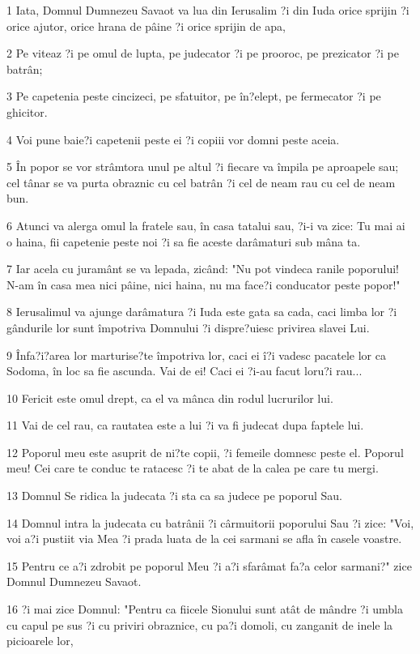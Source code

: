\par 1 Iata, Domnul Dumnezeu Savaot va lua din Ierusalim ?i din Iuda orice sprijin ?i orice ajutor, orice hrana de pâine ?i orice sprijin de apa,
\par 2 Pe viteaz ?i pe omul de lupta, pe judecator ?i pe prooroc, pe prezicator ?i pe batrân;
\par 3 Pe capetenia peste cincizeci, pe sfatuitor, pe în?elept, pe fermecator ?i pe ghicitor.
\par 4 Voi pune baie?i capetenii peste ei ?i copiii vor domni peste aceia.
\par 5 În popor se vor strâmtora unul pe altul ?i fiecare va împila pe aproapele sau; cel tânar se va purta obraznic cu cel batrân ?i cel de neam rau cu cel de neam bun.
\par 6 Atunci va alerga omul la fratele sau, în casa tatalui sau, ?i-i va zice: Tu mai ai o haina, fii capetenie peste noi ?i sa fie aceste darâmaturi sub mâna ta.
\par 7 Iar acela cu juramânt se va lepada, zicând: "Nu pot vindeca ranile poporului! N-am în casa mea nici pâine, nici haina, nu ma face?i conducator peste popor!"
\par 8 Ierusalimul va ajunge darâmatura ?i Iuda este gata sa cada, caci limba lor ?i gândurile lor sunt împotriva Domnului ?i dispre?uiesc privirea slavei Lui.
\par 9 Înfa?i?area lor marturise?te împotriva lor, caci ei î?i vadesc pacatele lor ca Sodoma, în loc sa fie ascunda. Vai de ei! Caci ei ?i-au facut loru?i rau...
\par 10 Fericit este omul drept, ca el va mânca din rodul lucrurilor lui.
\par 11 Vai de cel rau, ca rautatea este a lui ?i va fi judecat dupa faptele lui.
\par 12 Poporul meu este asuprit de ni?te copii, ?i femeile domnesc peste el. Poporul meu! Cei care te conduc te ratacesc ?i te abat de la calea pe care tu mergi.
\par 13 Domnul Se ridica la judecata ?i sta ca sa judece pe poporul Sau.
\par 14 Domnul intra la judecata cu batrânii ?i cârmuitorii poporului Sau ?i zice: "Voi, voi a?i pustiit via Mea ?i prada luata de la cei sarmani se afla în casele voastre.
\par 15 Pentru ce a?i zdrobit pe poporul Meu ?i a?i sfarâmat fa?a celor sarmani?" zice Domnul Dumnezeu Savaot.
\par 16 ?i mai zice Domnul: "Pentru ca fiicele Sionului sunt atât de mândre ?i umbla cu capul pe sus ?i cu priviri obraznice, cu pa?i domoli, cu zanganit de inele la picioarele lor,
